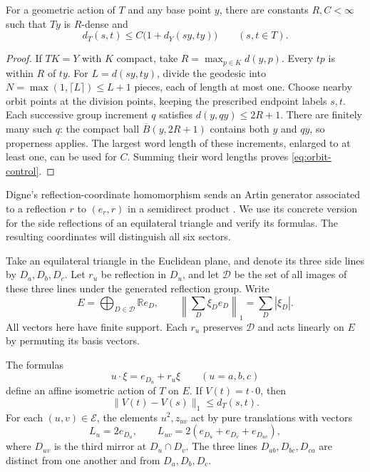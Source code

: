 \begin{lemma}\label{lem:orbit-control}
For a geometric action of \(T\) and any base point \(y\), there are
constants \(R,C<\infty\) such that \(Ty\) is \(R\)-dense and
\begin{equation}\label{eq:orbit-control}
 d_T(s,t)\le C\bigl(1+d_Y(sy,ty)\bigr)\qquad(s,t\in T).
\end{equation}
\end{lemma}

\begin{proof}
If \(TK=Y\) with \(K\) compact, take
\(R=\max_{p\in K}d(y,p)\).  Every \(tp\) is within \(R\) of \(ty\).
For \(L=d(sy,ty)\), divide the geodesic into
\(N=\max(1,\lceil L\rceil)\le L+1\) pieces, each of length at most one.
Choose nearby orbit points at the division points, keeping the prescribed
endpoint labels \(s,t\).  Each successive group increment \(q\) satisfies
\(d(y,qy)\le2R+1\).  There are finitely many such \(q\): the compact ball
\(\overline B(y,2R+1)\) contains both \(y\) and \(qy\), so properness
applies.  The largest word length of these increments, enlarged to at
least one, can be used for \(C\).  Summing their word lengths proves
\eqref{eq:orbit-control}.
\end{proof}

Digne's reflection-coordinate homomorphism sends an Artin generator
associated to a reflection \(r\) to \((e_r,r)\) in a semidirect product
\cite[Proposition~2.1]{Digne2016}.  We use its concrete version for the
side reflections of an equilateral triangle and verify its formulas.
The resulting coordinates will distinguish all six sectors.

Take an equilateral triangle in the Euclidean plane, and denote its
three side lines by \(D_a,D_b,D_c\).  Let \(r_u\) be reflection in
\(D_u\), and let \(\mathcal D\) be the set of all images of these three
lines under the generated reflection group.  Write
\[
 E=\bigoplus_{D\in\mathcal D}\mathbb R e_D,\qquad
 \left\|\sum_D \xi_D e_D\right\|_1=\sum_D|\xi_D|.
\]
All vectors here have finite support.  Each \(r_u\) preserves
\(\mathcal D\) and acts linearly on \(E\) by permuting its basis vectors.

\begin{lemma}\label{lem:mirror-action}
The formulas
\[
 u\cdot\xi=e_{D_u}+r_u\xi\qquad(u=a,b,c)
\]
define an affine isometric action of \(T\) on \(E\).  If \(V(t)=t\cdot0\),
then
\begin{equation}\label{eq:mirror-lipschitz}
 \|V(t)-V(s)\|_1\le d_T(s,t).
\end{equation}
For each \((u,v)\in\mathcal E\), the elements \(u^2,z_{uv}\) act by pure
translations with vectors
\begin{equation}\label{eq:mirror-translations}
 L_u=2e_{D_u},\qquad
 L_{uv}=2(e_{D_u}+e_{D_v}+e_{D_{uv}}),
\end{equation}
where \(D_{uv}\) is the third mirror at \(D_u\cap D_v\).
The three lines \(D_{ab},D_{bc},D_{ca}\) are distinct from one another
and from \(D_a,D_b,D_c\).
\end{lemma}

